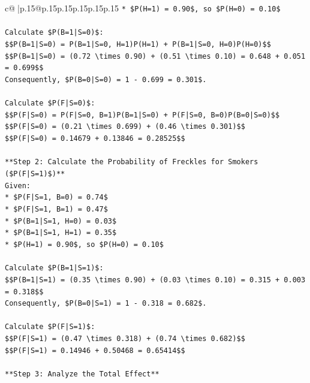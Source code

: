 \documentclass{article}
\begin{document}
{\begin{supertabular}{c@{$\;$}|p{.15\linewidth}@{}p{.15\linewidth}p{.15\linewidth}p{.15\linewidth}p{.15\linewidth}p{.15\linewidth}}
{{{\texttt{*   \$P(H=1) = 0.90\$, so \$P(H=0) = 0.10\$} \\
\\ 
\texttt{Calculate \$P(B=1|S=0)\$:} \\
\texttt{\$\$P(B=1|S=0) = P(B=1|S=0, H=1)P(H=1) + P(B=1|S=0, H=0)P(H=0)\$\$} \\
\texttt{\$\$P(B=1|S=0) = (0.72 \textbackslash{}times 0.90) + (0.51 \textbackslash{}times 0.10) = 0.648 + 0.051 = 0.699\$\$} \\
\texttt{Consequently, \$P(B=0|S=0) = 1 {-} 0.699 = 0.301\$.} \\
\\ 
\texttt{Calculate \$P(F|S=0)\$:} \\
\texttt{\$\$P(F|S=0) = P(F|S=0, B=1)P(B=1|S=0) + P(F|S=0, B=0)P(B=0|S=0)\$\$} \\
\texttt{\$\$P(F|S=0) = (0.21 \textbackslash{}times 0.699) + (0.46 \textbackslash{}times 0.301)\$\$} \\
\texttt{\$\$P(F|S=0) = 0.14679 + 0.13846 = 0.28525\$\$} \\
\\ 
\texttt{**Step 2: Calculate the Probability of Freckles for Smokers (\$P(F|S=1)\$)**} \\
\texttt{Given:} \\
\texttt{*   \$P(F|S=1, B=0) = 0.74\$} \\
\texttt{*   \$P(F|S=1, B=1) = 0.47\$} \\
\texttt{*   \$P(B=1|S=1, H=0) = 0.03\$} \\
\texttt{*   \$P(B=1|S=1, H=1) = 0.35\$} \\
\texttt{*   \$P(H=1) = 0.90\$, so \$P(H=0) = 0.10\$} \\
\\ 
\texttt{Calculate \$P(B=1|S=1)\$:} \\
\texttt{\$\$P(B=1|S=1) = (0.35 \textbackslash{}times 0.90) + (0.03 \textbackslash{}times 0.10) = 0.315 + 0.003 = 0.318\$\$} \\
\texttt{Consequently, \$P(B=0|S=1) = 1 {-} 0.318 = 0.682\$.} \\
\\ 
\texttt{Calculate \$P(F|S=1)\$:} \\
\texttt{\$\$P(F|S=1) = (0.47 \textbackslash{}times 0.318) + (0.74 \textbackslash{}times 0.682)\$\$} \\
\texttt{\$\$P(F|S=1) = 0.14946 + 0.50468 = 0.65414\$\$} \\
\\ 
\texttt{**Step 3: Analyze the Total Effect**} \\
}}}
\end{supertabular}}
\end{document}
